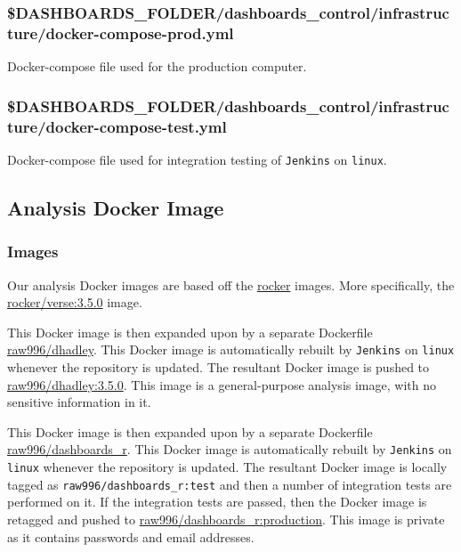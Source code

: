 \documentclass[12pt,]{article}
\begin{document}
\subsubsection{\$DASHBOARDS\_FOLDER/dashboards\_control/infrastructure/docker-compose-prod.yml}\label{dashboards_folderdashboards_controlinfrastructuredocker-compose-prod.yml}

Docker-compose file used for the production computer.

\subsubsection{\$DASHBOARDS\_FOLDER/dashboards\_control/infrastructure/docker-compose-test.yml}\label{dashboards_folderdashboards_controlinfrastructuredocker-compose-test.yml}

Docker-compose file used for integration testing of \texttt{Jenkins} on
\texttt{linux}.

\subsection{Analysis Docker Image}\label{analysisdocker}

\subsubsection{Images}\label{images}

Our analysis Docker images are based off the
\href{https://rocker-project.org}{rocker} images. More specifically, the
\href{https://hub.docker.com/r/rocker/verse/}{rocker/verse:3.5.0} image.

This Docker image is then expanded upon by a separate Dockerfile
\href{https://github.com/raubreywhite/docker/blob/master/dhadley/Dockerfile}{raw996/dhadley}.
This Docker image is automatically rebuilt by \texttt{Jenkins} on
\texttt{linux} whenever the repository is updated. The resultant Docker
image is pushed to
\href{https://hub.docker.com/r/raw996/dhadley/}{raw996/dhadley:3.5.0}.
This image is a general-purpose analysis image, with no sensitive
information in it.

This Docker image is then expanded upon by a separate Dockerfile
\href{https://github.com/raubreywhite/dashboards_control/blob/master/infrastructure/dashboards_r/Dockerfile}{raw996/dashboards\_r}.
This Docker image is automatically rebuilt by \texttt{Jenkins} on
\texttt{linux} whenever the repository is updated. The resultant Docker
image is locally tagged as \texttt{raw996/dashboards\_r:test} and then a
number of integration tests are performed on it. If the integration
tests are passed, then the Docker image is retagged and pushed to
\href{https://hub.docker.com/r/raw996/dashboards_r/}{raw996/dashboards\_r:production}.
This image is private as it contains passwords and email addresses.
\end{document}
